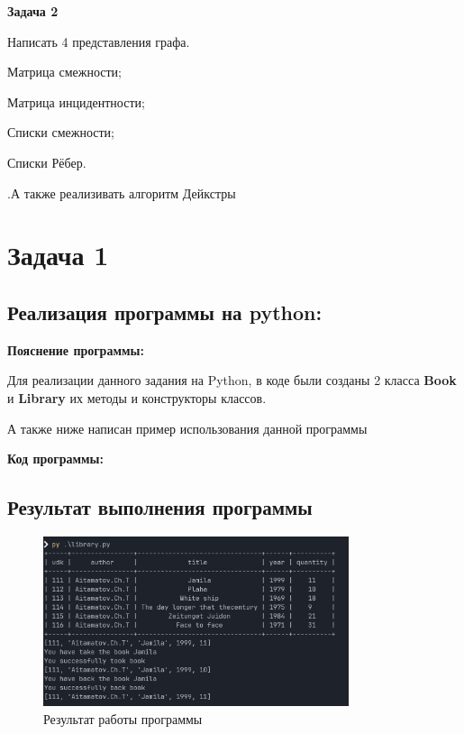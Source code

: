 \textbf{Задача 2}

Написать 4 представления графа.

\begin{compactitem}
    \item Матрица смежности;
    \item Матрица инцидентности;
    \item Списки смежности;
    \item Списки Рёбер.
\end{compactitem}

.А также реализивать алгоритм Дейкстры






\section{Задача 1}


\subsection{Реализация программы на python:}


\textbf{Пояснение программы:}

Для реализации данного задания на Python,
в коде были созданы 2 класса \textbf{Book} и \textbf{Library}
их методы и конструкторы классов.

А также ниже написан пример использования данной программы



\textbf{Код программы:}





\subsection{Результат выполнения программы}

\begin{figure}[H]
    \centering
    \includegraphics[width=0.8\textwidth]{./flowcharts/result_lib.png}
    \caption{Результат работы программы}
\end{figure}










